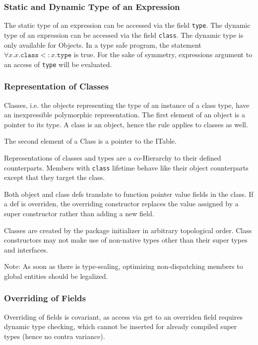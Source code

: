 \subsubsection{Static and Dynamic Type of an Expression}

The static type of an expression can be accessed via the field \texttt{type}.
The dynamic type of an expression can be accessed via the field \texttt{class}.
The dynamic type is only available for Objects.
In a type safe program, the statement $\forall x. x\texttt{.class} <: x\texttt{.type}$ is true.
For the sake of symmetry, expressions argument to an access of \texttt{type} will be evaluated.


\subsubsection{Representation of Classes}

Classes, i.e. the objects representing the type of an instance of a class type, have an inexpressible polymorphic representation.
The first element of an object is a pointer to its type.
A class is an object, hence the rule applies to classes as well.

The second element of a Class is a pointer to the ITable.

Representations of classes and types are a co-Hierarchy to their defined counterparts.
Members with \texttt{class} lifetime behave like their object counterparts except that they target the class.

Both object and class defs translate to function pointer value fields in the class.
If a def is overriden, the overriding constructor replaces the value assigned by a super constructor rather than adding a new field.

Classes are created by the package initializer in arbitrary topological order.
Class constructors may not make use of non-native types other than their super types and interfaces.

Note: As soon as there is type-sealing, optimizing non-dispatching members to global entities should be legalized.


\subsubsection{Overriding of Fields}

Overriding of fields is covariant, as access via get to an overriden field requires dynamic type checking, which cannot be inserted for already compiled super types (hence no contra variance).

